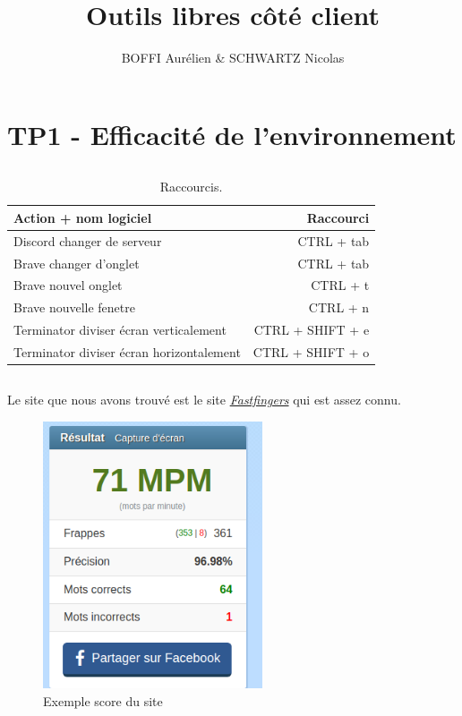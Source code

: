 \documentclass{article}
\title{Outils libres côté client}
\author{BOFFI Aurélien & SCHWARTZ Nicolas}
\begin{document}
\maketitle
\tableofcontents
\newpage

\section{TP1 - Efficacité de l'environnement}

\subsection{}

\begin{table}[h]
\centering
\begin{tabular}{l|r}

Action + nom logiciel& Raccourci \\\hline
Discord changer de serveur  & CTRL + tab \\\hline
Brave changer d'onglet   & CTRL + tab \\\hline
Brave nouvel onglet   & CTRL + t \\\hline
Brave nouvelle fenetre  & CTRL + n \\\hline
Terminator diviser écran verticalement   & CTRL + SHIFT + e \\\hline
Terminator diviser écran horizontalement   & CTRL + SHIFT + o \\\hline
\end{tabular}
\caption{\label{tab:widgets}Raccourcis.}
\end{table}


\subsection{}

Le site que nous avons trouvé est le site \href{https://10fastfingers.com/typing-test/french}{\emph{Fastfingers}} qui est assez connu.

\begin{figure}[h]
\centering
    \includegraphics[height=0.7\columnwidth]{screen/Fastfingers.png}
    \caption{\label{fig:frog}Exemple score du site}
\end{figure}
\FloatBarrier
\end{document}
